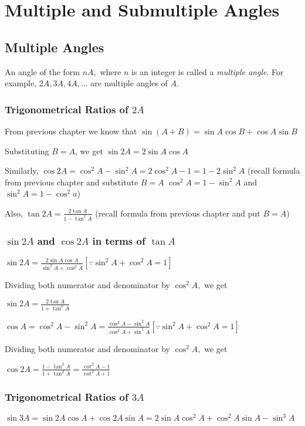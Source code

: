 \chapter{Multiple and Submultiple Angles}
\section{Multiple Angles}
An angle of the form $nA,$ where $n$ is an integer is called a \textit{multiple angle}. For example, $2A, 3A, 4A,
\ldots$ are multiple angles of $A.$

\subsection{Trigonometrical Ratios of $2A$}
From previous chapter we know that $\sin(A + B) = \sin A\cos B + \cos A\sin B$

\noindent Substituting $B = A$, we get $\sin 2A = 2\sin A\cos A$

\noindent Similarly, $\cos 2A = \cos^2A - \sin^2A = 2\cos^2A -  1 = 1 - 2\sin^2A$ (recall formula from previous chapter and
substitute $B = A$ $\cos^2A = 1 -\sin^2A$ and $\sin^2A = 1 - \cos^2a$)

\noindent Also, $\tan 2A = \frac{2\tan A}{1 - \tan^2A}$ (recall formula from previous chapter and put $B = A$)

\subsection{$\sin 2A$ and $\cos 2A$ in terms of $\tan A$}
$\sin 2A = \frac{2\sin A\cos A}{\sin^2A + \cos^2A}[\because \sin^2A + \cos^2A = 1]$

\noindent Dividing both numerator and denominator by $\cos^2A,$ we get

\noindent $\sin 2A = \frac{2\tan A}{1 + \tan^2A}$

\noindent $\cos A = \cos^2A - \sin^2A = \frac{\cos^2A - \sin^2A}{\cos^2A + \sin^2A}[\because \sin^2A + \cos^2A = 1]$

\noindent Dividing both numerator and denominator by $\cos^2A,$ we get

\noindent $\cos 2A = \frac{1 - \tan^2A}{1 + \tan^2A} = \frac{\cot^2A - 1}{\cot^2A + 1}$

\subsection{Trigonometrical Ratios of $3A$}
$\sin 3A = \sin2A\cos A + \cos 2A\sin A = 2\sin A\cos^2 A + \cos^2A\sin A - \sin^3A$

